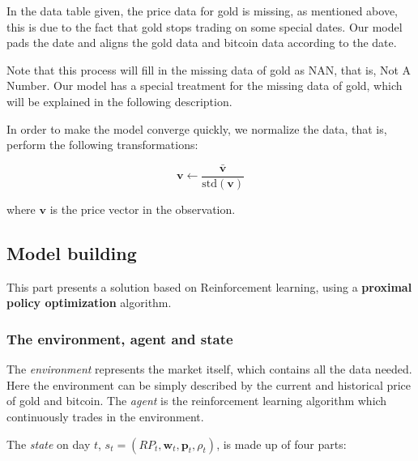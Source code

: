 \documentclass{mcmthesis}
\begin{document}


In the data table given, the price data for gold is missing, as mentioned above, this is due to the fact that gold stops trading on some special dates. Our model pads the date and aligns the gold data and bitcoin data according to the date.

Note that this process will fill in the missing data of gold as NAN, that is, Not A Number. Our model has a special treatment for the missing data of gold, which will be explained in the following description.

In order to make the model converge quickly, we normalize the data, that is, perform the following transformations:

\[
  \pmb{v} \leftarrow \frac{\bar{\pmb{v}}}{\mbox{std}(\pmb{v})}
\]


where $\pmb{v}$ is the price vector in the observation.

\subsection{Model building}

This part presents a solution based on Reinforcement learning,
using a \textbf{proximal policy optimization} algorithm.

\subsubsection{The environment, agent and state}

The \textit{environment} represents the market itself,
which contains all the data needed.
Here the environment can be simply described
by the current and historical price of gold and bitcoin.
The \textit{agent} is the reinforcement learning algorithm which
continuously trades in the environment.

The \textit{state} on day $t$, $s_t = (RP_t , \pmb{w}_t, \pmb{p}_t, \rho _t)$, is made up of four parts:
\end{document}
